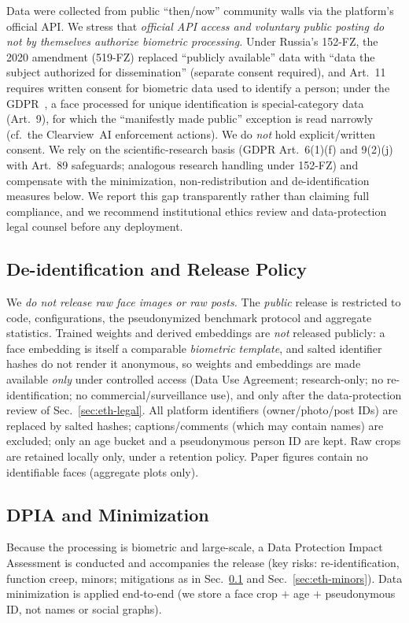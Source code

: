 \documentclass[journal]{IEEEtran}
\begin{document}
Data were collected from public ``then/now'' community walls via the platform's official API. We stress that \emph{official API access and voluntary public posting do not by themselves authorize biometric processing.} Under Russia's 152-FZ, the 2020 amendment (519-FZ) replaced ``publicly available'' data with ``data the subject authorized for dissemination'' (separate consent required), and Art.~11 requires written consent for biometric data used to identify a person; under the GDPR~\cite{gdpr2016}, a face processed for unique identification is special-category data (Art.~9), for which the ``manifestly made public'' exception is read narrowly (cf.\ the Clearview~AI enforcement actions). We do \emph{not} hold explicit/written consent. We rely on the scientific-research basis (GDPR Art.~6(1)(f) and 9(2)(j) with Art.~89 safeguards; analogous research handling under 152-FZ) and compensate with the minimization, non-redistribution and de-identification measures below. We report this gap transparently rather than claiming full compliance, and we recommend institutional ethics review and data-protection legal counsel before any deployment.

\subsection{De-identification and Release Policy}\label{sec:eth-deid}
We \emph{do not release raw face images or raw posts.} The \emph{public} release is restricted to code, configurations, the pseudonymized benchmark protocol and aggregate statistics. Trained weights and derived embeddings are \emph{not} released publicly: a face embedding is itself a comparable \emph{biometric template}, and salted identifier hashes do not render it anonymous, so weights and embeddings are made available \emph{only} under controlled access (Data Use Agreement; research-only; no re-identification; no commercial/surveillance use), and only after the data-protection review of Sec.~\ref{sec:eth-legal}. All platform identifiers (owner/photo/post IDs) are replaced by salted hashes; captions/comments (which may contain names) are excluded; only an age bucket and a pseudonymous person ID are kept. Raw crops are retained locally only, under a retention policy. Paper figures contain no identifiable faces (aggregate plots only).

\subsection{DPIA and Minimization}\label{sec:eth-dpia}
Because the processing is biometric and large-scale, a Data Protection Impact Assessment is conducted and accompanies the release (key risks: re-identification, function creep, minors; mitigations as in Sec.~\ref{sec:eth-deid} and Sec.~\ref{sec:eth-minors}). Data minimization is applied end-to-end (we store a face crop $+$ age $+$ pseudonymous ID, not names or social graphs).
\end{document}
